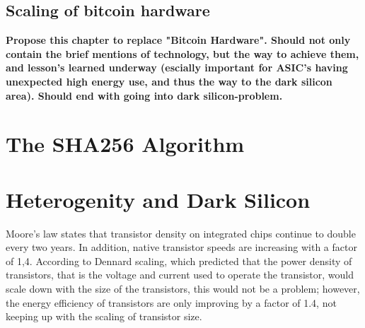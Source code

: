 \subsection{Scaling of bitcoin hardware}


\textbf{Propose this chapter to replace "Bitcoin Hardware". Should not only contain the brief mentions of technology, but the way to achieve them, and lesson's learned underway (escially important for ASIC's having unexpected high energy use, and thus the way to the dark silicon area). Should end with going into dark silicon-problem.}



\section{The SHA256 Algorithm}

\section{Heterogenity and Dark Silicon}
\label{sec:dark-silicon}

Moore's law states that transistor density on integrated chips continue to double every
two years. In addition, native transistor speeds are increasing with a factor of 1,4.
According to Dennard scaling, which predicted that the power density of transistors, that
is the voltage and current used to operate the transistor, would scale down with the
size of the transistors, this would not be a problem; however, the energy efficiency
of transistors are only improving by a factor of 1.4, not keeping up with the scaling
of transistor size.

